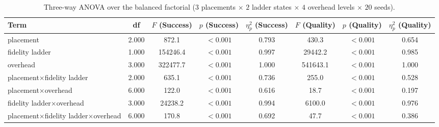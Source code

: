 \begin{table}
\centering
\scriptsize
\caption{Three-way ANOVA over the balanced factorial ($3$ placements $\times$ $2$ ladder states $\times$ $4$ overhead levels $\times$ $20$ seeds).}
\label{tab:p2-anova}
\begin{tabular}{lccccccc}
\toprule
Term & df & $F$ (Success) & $p$ (Success) & $\eta^2_p$ (Success) & $F$ (Quality) & $p$ (Quality) & $\eta^2_p$ (Quality) \\
\midrule
placement & 2.000 & 872.1 & $<0.001$ & 0.793 & 430.3 & $<0.001$ & 0.654 \\
fidelity ladder & 1.000 & 154246.4 & $<0.001$ & 0.997 & 29442.2 & $<0.001$ & 0.985 \\
overhead & 3.000 & 322477.7 & $<0.001$ & 1.000 & 541643.1 & $<0.001$ & 1.000 \\
placement$\times$fidelity ladder & 2.000 & 635.1 & $<0.001$ & 0.736 & 255.0 & $<0.001$ & 0.528 \\
placement$\times$overhead & 6.000 & 122.0 & $<0.001$ & 0.616 & 18.7 & $<0.001$ & 0.197 \\
fidelity ladder$\times$overhead & 3.000 & 24238.2 & $<0.001$ & 0.994 & 6100.0 & $<0.001$ & 0.976 \\
placement$\times$fidelity ladder$\times$overhead & 6.000 & 170.8 & $<0.001$ & 0.692 & 47.7 & $<0.001$ & 0.386 \\
\bottomrule
\end{tabular}
\par{}
\end{table}
